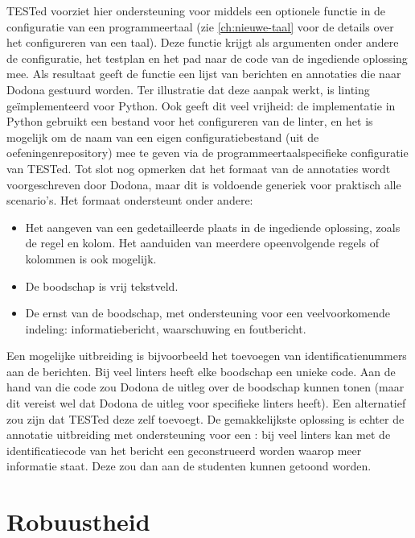 TESTed voorziet hier ondersteuning voor middels een optionele functie in de configuratie van een programmeertaal (zie \cref{ch:nieuwe-taal} voor de details over het configureren van een taal).
Deze functie krijgt als argumenten onder andere de configuratie, het testplan en het pad naar de code van de ingediende oplossing mee.
Als resultaat geeft de functie een lijst van berichten en annotaties die naar Dodona gestuurd worden.
Ter illustratie dat deze aanpak werkt, is linting geïmplementeerd voor Python.
Ook geeft dit veel vrijheid: de implementatie in Python gebruikt een bestand voor het configureren van de linter, en het is mogelijk om de naam van een eigen configuratiebestand (uit de oefeningenrepository) mee te geven via de programmeertaalspecifieke configuratie van TESTed.
Tot slot nog opmerken dat het formaat van de annotaties wordt voorgeschreven door Dodona, maar dit is voldoende generiek voor praktisch alle scenario's.
Het formaat ondersteunt onder andere:

\begin{itemize}
    \item Het aangeven van een gedetailleerde plaats in de ingediende oplossing, zoals de regel en kolom.
    Het aanduiden van meerdere opeenvolgende regels of kolommen is ook mogelijk.
    \item De boodschap is vrij tekstveld.
    \item De ernst van de boodschap, met ondersteuning voor een veelvoorkomende indeling: informatiebericht, waarschuwing en foutbericht.
\end{itemize}

Een mogelijke uitbreiding is bijvoorbeeld het toevoegen van identificatienummers aan de berichten.
Bij veel linters heeft elke boodschap een unieke code.
Aan de hand van die code zou Dodona de uitleg over de boodschap kunnen tonen (maar dit vereist wel dat Dodona de uitleg voor specifieke linters heeft).
Een alternatief zou zijn dat TESTed deze zelf toevoegt.
De gemakkelijkste oplossing is echter de annotatie uitbreiding met ondersteuning voor een : bij veel linters kan met de identificatiecode van het bericht een  geconstrueerd worden waarop meer informatie staat.
Deze  zou dan aan de studenten kunnen getoond worden.

\section{Robuustheid}\label{sec:robuustheid}

